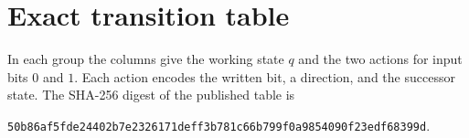 \documentclass[11pt,letterpaper]{article}
\newcommand{\code}[1]{\texttt{\nolinkurl{#1}}}
\begin{document}
\appendix
\section{Exact transition table}\label{app:table}

In each group the columns give the working state $q$ and the two
actions for input bits $0$ and $1$. Each action encodes the written
bit, a direction, and the successor state. The SHA-256 digest of the
published table is
\begin{center}\small
\code{50b86af5fde24402b7e2326171deff3b781c66b799f0a9854090f23edf68399d}.
\end{center}

\end{document}
